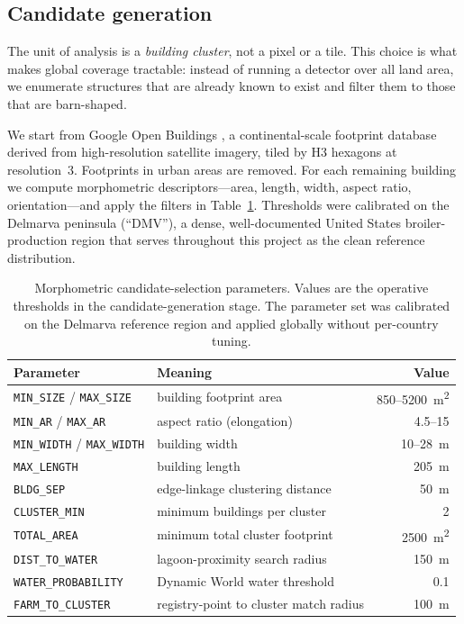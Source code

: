 \documentclass[11pt,a4paper]{article}
\newcommand{\code}[1]{\texttt{\small #1}}
\begin{document}
\subsection{Candidate generation}
\label{sec:candidates}

The unit of analysis is a \emph{building cluster}, not a pixel or a tile. This
choice is what makes global coverage tractable: instead of running a detector
over all land area, we enumerate structures that are already known to exist and
filter them to those that are barn-shaped.

We start from Google Open Buildings \citep{sirko2021openbuildings}, a
continental-scale footprint database derived from high-resolution satellite
imagery, tiled by H3 hexagons at resolution~3. Footprints in urban areas are
removed. For each remaining building we compute morphometric descriptors---area,
length, width, aspect ratio, orientation---and apply the filters in
Table~\ref{tab:morphometry}. Thresholds were calibrated on the Delmarva
peninsula (``DMV''), a dense, well-documented United States broiler-production
region that serves throughout this project as the clean reference distribution.

\begin{table}[t]
\centering
\small
\caption{Morphometric candidate-selection parameters. Values are the operative
thresholds in the candidate-generation stage. The parameter set was calibrated
on the Delmarva reference region and applied globally without per-country
tuning.}
\label{tab:morphometry}
\begin{tabular}{llr}
\toprule
Parameter & Meaning & Value \\
\midrule
\code{MIN\_SIZE} / \code{MAX\_SIZE} & building footprint area & \SI{850}{}--\SI{5200}{\metre\squared} \\
\code{MIN\_AR} / \code{MAX\_AR}     & aspect ratio (elongation) & 4.5--15 \\
\code{MIN\_WIDTH} / \code{MAX\_WIDTH} & building width & \SI{10}{}--\SI{28}{\metre} \\
\code{MAX\_LENGTH}                  & building length & \SI{205}{\metre} \\
\code{BLDG\_SEP}                    & edge-linkage clustering distance & \SI{50}{\metre} \\
\code{CLUSTER\_MIN}                 & minimum buildings per cluster & 2 \\
\code{TOTAL\_AREA}                  & minimum total cluster footprint & \SI{2500}{\metre\squared} \\
\code{DIST\_TO\_WATER}              & lagoon-proximity search radius & \SI{150}{\metre} \\
\code{WATER\_PROBABILITY}           & Dynamic World water threshold & 0.1 \\
\code{FARM\_TO\_CLUSTER}            & registry-point to cluster match radius & \SI{100}{\metre} \\
\bottomrule
\end{tabular}
\end{table}
\end{document}
